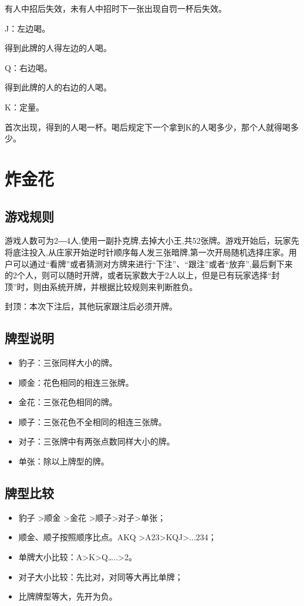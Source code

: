 \documentclass{ctexbook}
\begin{document}
有人中招后失效，未有人中招时下一张出现自罚一杯后失效。



J：左边喝。

得到此牌的人得左边的人喝。

Q：右边喝。

得到此牌的人的右边的人喝。

K：定量。

首次出现，得到的人喝一杯。喝后规定下一个拿到K的人喝多少，那个人就得喝多少。
\section{炸金花}
\subsection{游戏规则}
游戏人数可为2―4人,使用一副扑克牌,去掉大小王,共52张牌。游戏开始后，玩家先将底注投入,从庄家开始逆时针顺序每人发三张暗牌,第一次开局随机选择庄家。用户可以通过“看牌”或者猜测对方牌来进行“下注”、“跟注”或者“放弃”,最后剩下来的2个人，则可以随时开牌，或者玩家数大于2人以上，但是已有玩家选择“封顶”时，则由系统开牌，并根据比较规则来判断胜负。

封顶：本次下注后，其他玩家跟注后必须开牌。

\subsection{牌型说明}
\begin{itemize}
\item 豹子：三张同样大小的牌。
\item 顺金：花色相同的相连三张牌。
\item 金花：三张花色相同的牌。
\item 顺子：三张花色不全相同的相连三张牌。
\item 对子：三张牌中有两张点数同样大小的牌。
\item 单张：除以上牌型的牌。
\end{itemize}
\subsection{牌型比较}
\begin{itemize}
    \item 豹子 >顺金 >金花 >顺子>对子>单张；
    \item 顺金、顺子按照顺序比点。AKQ >A23>KQJ>...234；
    \item 单牌大小比较：A>K>Q…..>2。
    \item 对子大小比较：先比对，对同等大再比单牌；
    \item 比牌牌型等大，先开为负。
\end{itemize}
\end{document}
